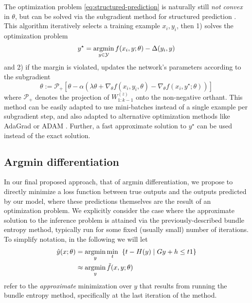 The optimization problem \eqref{eq:structured-prediction} is naturally still
\emph{not convex} in $\theta$, but can be solved via the subgradient method
for structured prediction \citep{ratliff2007approximate}.  This algorithm
iteratively selects a training example $x_i, y_i$, then 1) solves the
optimization problem
\begin{equation}
y^\star = \operatorname*{argmin}_{y \in \mathcal{Y}} f(x_i,y;\theta) - \Delta(y_i,y)
\end{equation}
and 2) if the margin is violated, updates the network's parameters according
to the subgradient
\begin{equation}
\theta := \mathcal{P}_+\left [ \theta - \alpha \left(
                \lambda\theta +
                \nabla_\theta f(x_i,y_i,\theta) -
                \nabla_\theta f (x_i, y^\star;\theta)\right)\right ]
\end{equation}
where $\mathcal{P}_+$ denotes the projection of $W^{(z)}_{1:k-1}$ onto the non-negative
orthant. This method can be easily adapted to use mini-batches instead of a
single example per subgradient step, and also adapted to alternative optimization
methods like AdaGrad \citep{duchi2011adaptive} or ADAM \citep{kingma2014adam}.
Further, a fast approximate solution to $y^\star$ can be used instead
of the exact solution.

\subsection{Argmin differentiation}

In our final proposed approach, that of argmin differentiation, we
propose to directly minimize a loss function between true outputs and the
outputs predicted by our model, where these predictions themselves are the
result of an optimization problem.  We explicitly consider the case where the
approximate solution to the inference problem is attained via the
previously-described bundle entropy method, typically run for some fixed
(usually small) number of iterations. To simplify notation, in the following we
will let
\begin{equation}
  \begin{split}
\hat{y}(x;\theta) &= \operatorname*{argmin}_{y} \min_t \;\; \{t - H(y) \mid G y + h \leq t1 \} \\
& \approx \operatorname*{argmin}_y \tilde{f}(x,y;\theta)
  \end{split}
\end{equation}
refer to the \emph{approximate} minimization over $y$ that
results from running the bundle entropy method, specifically at the last
iteration of the method.

